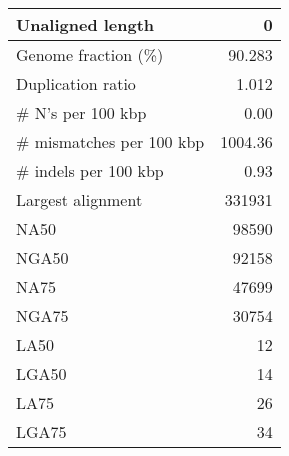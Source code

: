 \documentclass[12pt,a4paper]{article}
\begin{document}
\begin{table}[ht]
\begin{center}
\begin{tabular}{|l*{1}{|r}|}
Unaligned length & 0 \\ \hline
Genome fraction (\%) & 90.283 \\ \hline
Duplication ratio & 1.012 \\ \hline
\# N's per 100 kbp & 0.00 \\ \hline
\# mismatches per 100 kbp & 1004.36 \\ \hline
\# indels per 100 kbp & 0.93 \\ \hline
Largest alignment & 331931 \\ \hline
NA50 & 98590 \\ \hline
NGA50 & 92158 \\ \hline
NA75 & 47699 \\ \hline
NGA75 & 30754 \\ \hline
LA50 & 12 \\ \hline
LGA50 & 14 \\ \hline
LA75 & 26 \\ \hline
LGA75 & 34 \\ \hline
\end{tabular}
\end{center}
\end{table}
\end{document}
